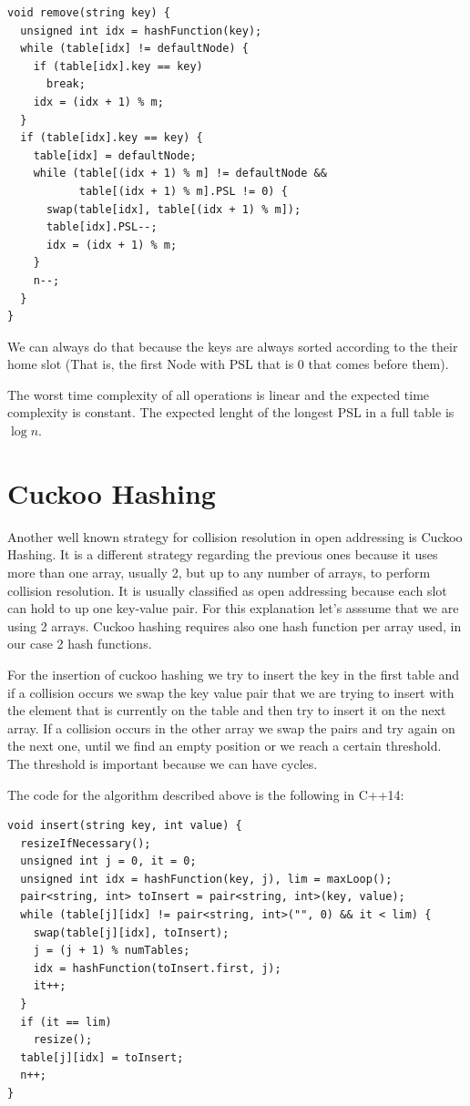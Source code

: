 \begin{lstlisting}
void remove(string key) {
  unsigned int idx = hashFunction(key);
  while (table[idx] != defaultNode) {
    if (table[idx].key == key) 
      break;
    idx = (idx + 1) % m;
  }
  if (table[idx].key == key) {
    table[idx] = defaultNode;
    while (table[(idx + 1) % m] != defaultNode &&
           table[(idx + 1) % m].PSL != 0) {
      swap(table[idx], table[(idx + 1) % m]);
      table[idx].PSL--;
      idx = (idx + 1) % m;
    }
    n--;
  }
}
\end{lstlisting}

We can always do that because the keys are always sorted according to the their home slot (That is, the first Node with PSL that is 0 that comes before them).

The worst time complexity of all operations is linear and the expected time complexity is constant. The expected lenght of the longest PSL in a full table is \( \log n \).

\section{Cuckoo Hashing}

Another well known strategy for collision resolution in open addressing is Cuckoo Hashing. It is a different strategy regarding the previous ones because it uses more than one array, usually 2, but up to any number of arrays, to perform collision resolution. It is usually classified as open addressing because each slot can hold to up one key-value pair. For this explanation let's asssume that we are using 2 arrays. Cuckoo hashing requires also one hash function per array used, in our case 2 hash functions.


For the insertion of cuckoo hashing we try to insert the key in the first table and if a collision occurs we swap the key value pair that we are trying to insert with the element that is currently on the table and then try to insert it on the next array. If a collision occurs in the other array we swap the pairs and try again on the next one, until we find an empty position or we reach a certain threshold. The threshold is important because we can have cycles.


The code for the algorithm described above is the following in C++14:

\begin{lstlisting}
void insert(string key, int value) {
  resizeIfNecessary();
  unsigned int j = 0, it = 0;
  unsigned int idx = hashFunction(key, j), lim = maxLoop();
  pair<string, int> toInsert = pair<string, int>(key, value);
  while (table[j][idx] != pair<string, int>("", 0) && it < lim) {
    swap(table[j][idx], toInsert);
    j = (j + 1) % numTables;
    idx = hashFunction(toInsert.first, j);
    it++;
  }
  if (it == lim)
    resize();
  table[j][idx] = toInsert;
  n++;
}
\end{lstlisting}

